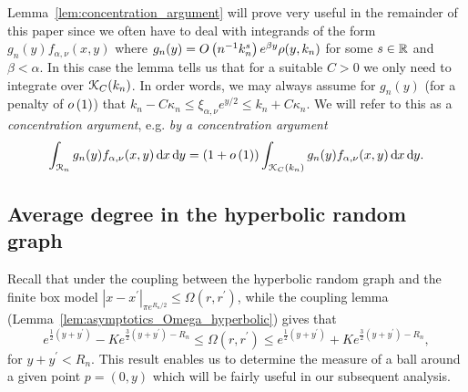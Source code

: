 \begin{remark}\label{rmk:concentration_argument}
Lemma~\ref{lem:concentration_argument} will prove very useful in the remainder of this paper since we often have to deal with integrands of the form $g_n(y) f_{\alpha,\nu}(x,y)$ where $g_n(y) = O\left(n^{-1} k_n^{s}\right)e^{\beta y}\rho(y,k_n)$ for some $s \in {\ensuremath{\mathbb R}}$ and $\beta < \alpha$. In this case the lemma tells us that for a suitable $C > 0$ we only need to integrate over ${\mathcal K}_C(k_n)$. In order words, we may always assume for $g_n(y)$ (for a penalty of $o\left(1\right)$) that $k_n - C \kappa_n \le \xi_{\alpha,\nu} e^{y/2} \le k_n + C \kappa_n$. We will refer to this as a \emph{concentration argument}, e.g. \emph{by a concentration argument}
\[
	\int_{{\mathcal R}_n} g_n(y) f_{\alpha, \nu}(x,y) \operatorname{\mathrm{d}\hspace{-2pt}} x \operatorname{\mathrm{d}\hspace{-2pt}} y 
	= (1+o\left(1\right)) \int_{{\mathcal K}_C(k_n)} g_n(y) f_{\alpha, \nu}(x,y) \operatorname{\mathrm{d}\hspace{-2pt}} x \operatorname{\mathrm{d}\hspace{-2pt}} y.
\]
\end{remark}

\subsection{Average degree in the hyperbolic random graph}\label{ssec:average_degree_HP_n}

Recall that under the coupling between the hyperbolic random graph and the finite box model $|x-x^\prime|_{\pi e^{R_n/2}} \le \Omega(r,r^\prime)$, while the coupling lemma (Lemma~\ref{lem:asymptotics_Omega_hyperbolic}) gives that  
\[
	e^{\frac{1}{2}(y+y^\prime)} - K e^{\frac{3}{2}(y+y^\prime) - R_n} \leq \Omega(r, r^\prime) 
		\leq  e^{\frac{1}{2}(y+y^\prime)} + K e^{\frac{3}{2}(y+y^\prime) - R_n},
\]
for $y + y^\prime < R_n$.  This result enables us to determine the measure of a ball around a given point $p=(0,y)$ which will be fairly useful in our subsequent analysis. 


